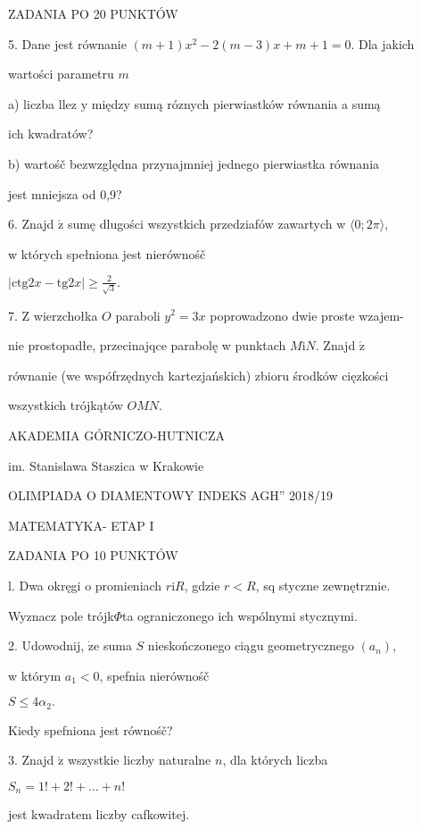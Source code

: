\documentclass[a4paper,12pt]{article}
\begin{document}
ZADANIA PO 20 PUNKTÓW

5. Dane jest równanie $(m+1)x^{2}-2(m-3)x+m+1=0$. Dla jakich

wartości parametru $m$

a) liczba llez $\mathrm{y}$ między sumą róznych pierwiastków równania a sumą

ich kwadratów?

b) wartośč bezwzględna przynajmniej jednego pierwiastka równania

jest mniejsza od 0,9?

6. Znajd $\acute{\mathrm{z}}$ sumę dlugości wszystkich przedziafów zawartych w $\langle 0;2\pi\rangle,$

w których spełniona jest nierównośč

$|\displaystyle \mathrm{c}\mathrm{t}\mathrm{g}2x-\mathrm{t}\mathrm{g}2x|\geq\frac{2}{\sqrt{3}}.$

7. $\mathrm{Z}$ wierzchołka $O$ paraboli $y^{2}=3x$ poprowadzono dwie proste wzajem-

nie prostopadłe, przecinajqce parabolę w punktach $M \mathrm{i} N.$ Znajd $\acute{\mathrm{z}}$

równanie (we wspófrzędnych kartezjańskich) zbioru środków cięzkości

wszystkich trójkątów $OMN.$






AKADEMIA GÓRNICZO-HUTNICZA

im. Stanislawa Staszica w Krakowie

OLIMPIADA O DIAMENTOWY INDEKS AGH'' 2018/19

MATEMATYKA- ETAP I

ZADANIA PO 10 PUNKTÓW

l. Dwa okręgi o promieniach $r\mathrm{i}R$, gdzie $r<R$, sq styczne zewnętrznie.

Wyznacz pole trójk$\Phi$ta ograniczonego ich wspólnymi stycznymi.

2. Udowodnij, $\dot{\mathrm{z}}\mathrm{e}$ suma $S$ nieskończonego ciągu geometrycznego $(a_{n}),$

w którym $a_{1}<0$, spefnia nierównośč

$S\leq 4\alpha_{2}.$

Kiedy spefniona jest równośč?

3. Znajd $\acute{\mathrm{z}}$ wszystkie liczby naturalne $n$, dla których liczba

$S_{n}=1!+2!+\ldots+n!$

jest kwadratem liczby cafkowitej.
\end{document}
